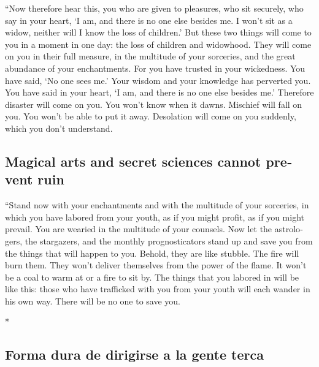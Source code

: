\begin{paracol}{2}
\begin{otherlanguage}{english}
 ``Now therefore hear this, you who are given to
pleasures, who sit securely, who say in your heart, `I am, and there is
no one else besides me. I won't sit as a widow, neither will I know the
loss of children.'  But these two things will come to you
in a moment in one day: the loss of children and widowhood. They will
come on you in their full measure, in the multitude of your sorceries,
and the great abundance of your enchantments.  For you
have trusted in your wickedness. You have said, `No one sees me.' Your
wisdom and your knowledge has perverted you. You have said in your
heart, `I am, and there is no one else besides me.' 
Therefore disaster will come on you. You won't know when it dawns.
Mischief will fall on you. You won't be able to put it away. Desolation
will come on you suddenly, which you don't understand.

\hypertarget{magical-arts-and-secret-sciences-cannot-prevent-ruin}{%
\subsection{Magical arts and secret sciences cannot prevent
ruin}\label{magical-arts-and-secret-sciences-cannot-prevent-ruin}}

 ``Stand now with your enchantments and with the
multitude of your sorceries, in which you have labored from your youth,
as if you might profit, as if you might prevail.  You are
wearied in the multitude of your counsels. Now let the astrologers, the
stargazers, and the monthly prognosticators stand up and save you from
the things that will happen to you.  Behold, they are
like stubble. The fire will burn them. They won't deliver themselves
from the power of the flame. It won't be a coal to warm at or a fire to
sit by.  The things that you labored in will be like
this: those who have trafficked with you from your youth will each
wander in his own way. There will be no one to save you.

\end{otherlanguage}

\switchcolumn[0]*

\hypertarget{forma-dura-de-dirigirse-a-la-gente-terca}{%
\subsection{Forma dura de dirigirse a la gente
terca}\label{forma-dura-de-dirigirse-a-la-gente-terca}}


\end{paracol}
